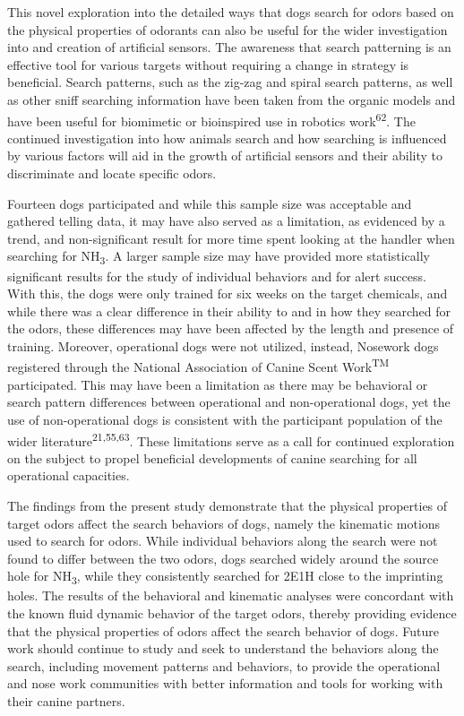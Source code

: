 \documentclass[
]{article}
\begin{document}
This novel exploration into the detailed ways that dogs search for odors based on the physical properties of odorants can also be useful for the wider investigation into and creation of artificial sensors. The awareness that search patterning is an effective tool for various targets without requiring a change in strategy is beneficial. Search patterns, such as the zig-zag and spiral search patterns, as well as other sniff searching information have been taken from the organic models and have been useful for biomimetic or bioinspired use in robotics work\textsuperscript{62}. The continued investigation into how animals search and how searching is influenced by various factors will aid in the growth of artificial sensors and their ability to discriminate and locate specific odors.

Fourteen dogs participated and while this sample size was acceptable and gathered telling data, it may have also served as a limitation, as evidenced by a trend, and non-significant result for more time spent looking at the handler when searching for NH\textsubscript{3}. A larger sample size may have provided more statistically significant results for the study of individual behaviors and for alert success. With this, the dogs were only trained for six weeks on the target chemicals, and while there was a clear difference in their ability to and in how they searched for the odors, these differences may have been affected by the length and presence of training. Moreover, operational dogs were not utilized, instead, Nosework dogs registered through the National Association of Canine Scent Work\textsuperscript{TM} participated. This may have been a limitation as there may be behavioral or search pattern differences between operational and non-operational dogs, yet the use of non-operational dogs is consistent with the participant population of the wider literature\textsuperscript{21,55,63}. These limitations serve as a call for continued exploration on the subject to propel beneficial developments of canine searching for all operational capacities.

The findings from the present study demonstrate that the physical properties of target odors affect the search behaviors of dogs, namely the kinematic motions used to search for odors. While individual behaviors along the search were not found to differ between the two odors, dogs searched widely around the source hole for NH\textsubscript{3}, while they consistently searched for 2E1H close to the imprinting holes. The results of the behavioral and kinematic analyses were concordant with the known fluid dynamic behavior of the target odors, thereby providing evidence that the physical properties of odors affect the search behavior of dogs. Future work should continue to study and seek to understand the behaviors along the search, including movement patterns and behaviors, to provide the operational and nose work communities with better information and tools for working with their canine partners.
\end{document}
